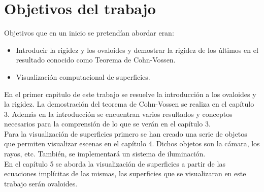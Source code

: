 \chapter{Objetivos del trabajo}

Objetivos que en un inicio se pretendían abordar eran:
\begin{itemize}
	\item Introducir la rigidez y los ovaloides y demostrar la rigidez de los últimos en el resultado conocido como Teorema de Cohn-Vossen.
	\item Visualización computacional de superficies.
\end{itemize}
${ }$\\

En el primer capitulo de este trabajo se resuelve la introducción a los ovaloides y la rigidez. La demostración del teorema de Cohn-Vossen se realiza en el capítulo 3. Además en la introducción se encuentran varios resultados y conceptos necesarios para la comprensión de lo que se verán en el capítulo 3.
${ }$\\

Para la visualización de superficies primero se han creado una serie de objetos que permiten visualizar escenas en el capítulo 4. Dichos objetos son la cámara, los rayos, etc. También, se implementará un sistema de iluminación.
${ }$\\

En el capítulo 5 se aborda la visualización de superficies a partir de las ecuaciones implícitas de las mismas, las superficies que se visualizaran en este trabajo serán ovaloides.
${ }$\\